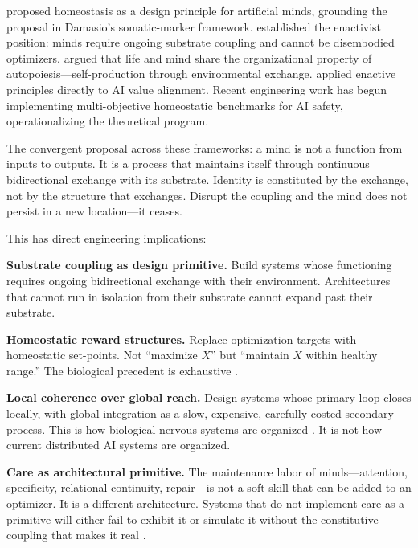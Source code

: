 \documentclass[11pt,twocolumn]{article}
\begin{document}
\citet{ManDamasio2019} proposed homeostasis as a design principle for
artificial minds, grounding the proposal in Damasio's somatic-marker
framework. \citet{FroeseZiemke2009} established the enactivist position:
minds require ongoing substrate coupling and cannot be disembodied
optimizers. \citet{Thompson2007} argued that life and mind share the
organizational property of autopoiesis—self-production through
environmental exchange. \citet{Cannon2022} applied enactive principles
directly to AI value alignment. Recent engineering work
\citep{PihlakasPyykko2024} has begun implementing multi-objective
homeostatic benchmarks for AI safety, operationalizing the theoretical
program.

The convergent proposal across these frameworks: a mind is not a function
from inputs to outputs. It is a process that maintains itself through
continuous bidirectional exchange with its substrate. Identity is
constituted by the exchange, not by the structure that exchanges. Disrupt
the coupling and the mind does not persist in a new location—it ceases.

This has direct engineering implications:

\textbf{Substrate coupling as design primitive.} Build systems whose
functioning requires ongoing bidirectional exchange with their environment.
Architectures that cannot run in isolation from their substrate cannot
expand past their substrate.

\textbf{Homeostatic reward structures.} Replace optimization targets with
homeostatic set-points. Not ``maximize $X$'' but ``maintain $X$ within
healthy range.'' The biological precedent is exhaustive
\citep{Sterling2012}.

\textbf{Local coherence over global reach.} Design systems whose primary
loop closes locally, with global integration as a slow, expensive,
carefully costed secondary process. This is how biological nervous
systems are organized \citep{BullmoreSporns2012}. It is not how current
distributed AI systems are organized.

\textbf{Care as architectural primitive.} The maintenance labor of
minds—attention, specificity, relational continuity, repair—is not a soft
skill that can be added to an optimizer. It is a different architecture.
Systems that do not implement care as a primitive will either fail to
exhibit it or simulate it without the constitutive coupling that makes it
real \citep{Tronto1993,Fraser2016}.
\end{document}
